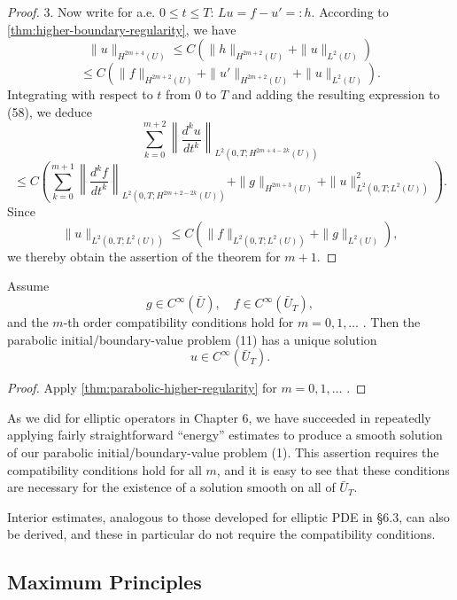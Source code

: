 \begin{proof}
3. Now write for a.e. $0 \leq t \leq T$: $Lu = f - u' =: h$. According to \cref{thm:higher-boundary-regularity}, we have
\[
\|u\|_{H^{2m+4}(U)} \leq C(\|h\|_{H^{2m+2}(U)} + \|u\|_{L^2(U)})
\]
\[
\leq C(\|f\|_{H^{2m+2}(U)} + \|u'\|_{H^{2m+2}(U)} + \|u\|_{L^2(U)}).
\]
Integrating with respect to $t$ from $0$ to $T$ and adding the resulting expression to (58), we deduce
\[
\sum_{k=0}^{m+2} \left\| \frac{d^k u}{dt^k} \right\|_{L^2(0,T;H^{2m+4-2k}(U))}
\]
\[
\leq C \left( \sum_{k=0}^{m+1} \left\| \frac{d^k f}{dt^k} \right\|_{L^2(0,T;H^{2m+2-2k}(U))} + \|g\|_{H^{2m+3}(U)} + \|u\|^2_{L^2(0,T;L^2(U))} \right).
\tag{60}
\]
Since
\[
\|u\|_{L^2(0,T;L^2(U))} \leq C(\|f\|_{L^2(0,T;L^2(U))} + \|g\|_{L^2(U)}),
\]
we thereby obtain the assertion of the theorem for $m + 1$.
\end{proof}

\begin{theorem}
\label{thm:parabolic-infinite-differentiability}
Assume
\[
g \in C^\infty(\bar{U}), \quad f \in C^\infty(\bar{U}_T),
\]
and the $m$-th order compatibility conditions hold for $m = 0, 1, \ldots$ . Then the parabolic initial/boundary-value problem (11) has a unique solution
\[
u \in C^\infty(\bar{U}_T).
\]
\end{theorem}

\begin{proof}
Apply \cref{thm:parabolic-higher-regularity} for $m = 0, 1, \ldots$ .
\end{proof}

As we did for elliptic operators in Chapter 6, we have succeeded in repeatedly applying fairly straightforward ``energy'' estimates to produce a smooth solution of our parabolic initial/boundary-value problem (1). This assertion requires the compatibility conditions hold for all $m$, and it is easy to see that these conditions are necessary for the existence of a solution smooth on all of $\bar{U}_T$.

\begin{remark}
\label{rem:parabolic-interior-estimates}
Interior estimates, analogous to those developed for elliptic PDE in \S6.3, can also be derived, and these in particular do not require the compatibility conditions.
\end{remark}

\subsection{Maximum Principles}


